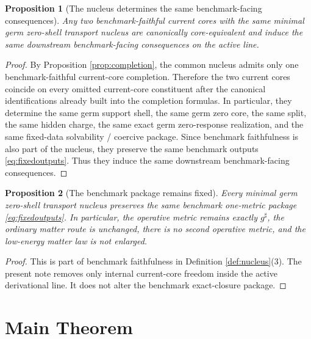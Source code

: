 \documentclass[11pt]{article}
\newcommand{\CompletedMetric}{g^{\sharp}}
\newtheorem{proposition}{Proposition}
\begin{document}
\begin{proposition}[The nucleus determines the same benchmark-facing consequences]
\label{prop:frontier}
Any two benchmark-faithful current cores with the same minimal germ zero-shell transport nucleus are canonically core-equivalent and induce the same downstream benchmark-facing consequences on the active line.
\end{proposition}

\begin{proof}
By Proposition \ref{prop:completion}, the common nucleus admits only one benchmark-faithful current-core completion. Therefore the two current cores coincide on every omitted current-core constituent after the canonical identifications already built into the completion formulas. In particular, they determine the same germ support shell, the same germ zero core, the same split, the same hidden charge, the same exact germ zero-response realization, and the same fixed-data solvability / coercive package. Since benchmark faithfulness is also part of the nucleus, they preserve the same benchmark outputs \eqref{eq:fixedoutputs}. Thus they induce the same downstream benchmark-facing consequences.
\end{proof}

\begin{proposition}[The benchmark package remains fixed]
\label{prop:benchmark}
Every minimal germ zero-shell transport nucleus preserves the same benchmark one-metric package \eqref{eq:fixedoutputs}. In particular, the operative metric remains exactly \(\CompletedMetric\), the ordinary matter route is unchanged, there is no second operative metric, and the low-energy matter law is not enlarged.
\end{proposition}

\begin{proof}
This is part of benchmark faithfulness in Definition \ref{def:nucleus}(3). The present note removes only internal current-core freedom inside the active derivational line. It does not alter the benchmark exact-closure package.
\end{proof}

\section{Main Theorem}
\end{document}
